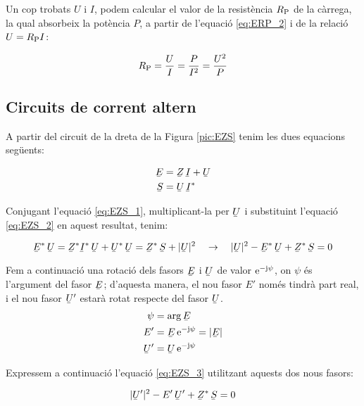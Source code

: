 Un cop trobats $U$ i $I$, podem calcular el valor de la resistència
$R_\mathrm{P}$ de la càrrega, la qual absorbeix la potència $P$, a
partir de l'equació \eqref{eq:ERP_2} i de la relació $U =R_\mathrm{P}
I$:

\begin{equation}
   R_\mathrm{P} = \frac{U}{I} = \frac{P}{I^2} = \frac{U^2}{P}
\end{equation}

\subsection{Circuits de corrent altern}

A partir del circuit de la dreta de la Figura \vref{pic:EZS} tenim les dues equacions següents:

\begin{align}
   \cmplx{E} &= \cmplx{Z} \, \cmplx{I} + \cmplx{U} \label{eq:EZS_1} \\
   \cmplx{S} &= \cmplx{U} \, \cmplx{I}^*           \label{eq:EZS_2}
\end{align}

Conjugant l'equació \eqref{eq:EZS_1}, multiplicant-la per $\cmplx{U}$ i substituint l'equació \eqref{eq:EZS_2} en aquest resultat, tenim:

\begin{equation}
   \cmplx{E}^* \, \cmplx{U} = \cmplx{Z}^* \cmplx{I}^* \, \cmplx{U} + \cmplx{U}^* \, \cmplx{U} =
   \cmplx{Z}^* \, \cmplx{S} + |\cmplx{U}|^2 \quad \rightarrow \quad
   |\cmplx{U}|^2 - \cmplx{E}^* \, \cmplx{U} + \cmplx{Z}^* \, \cmplx{S} = 0
   \label{eq:EZS_3}
\end{equation}

Fem a continuació una rotació dels fasors $\cmplx{E}$ i
$\cmplx{U}$ de valor $\mathrm{e}^{-\mathrm{j}\psi}$, on $\psi$ és l'argument
del fasor $\cmplx{E}$; d'aquesta manera, el nou fasor $E'$ només tindrà part real, i el nou fasor $\cmplx{U}'$ estarà rotat
respecte del fasor $\cmplx{U}$.
\begin{align}
   \psi &= \arg\cmplx{E} \label{eq:EZS_9} \\
   E' &= \cmplx{E} \, \eu^{-\ju\psi} = |\cmplx{E}|  \label{eq:EZS_4} \\
   \cmplx{U}' &= \cmplx{U} \, \eu^{-\ju\psi}   \label{eq:EZS_5}
\end{align}

Expressem a continuació l'equació \eqref{eq:EZS_3} utilitzant
aquests dos nous fasors:

\begin{equation}
   |\cmplx{U}'|^2 - E' \, \cmplx{U}' + \cmplx{Z}^* \, \cmplx{S} = 0 \label{eq:EZS_6}
\end{equation}


